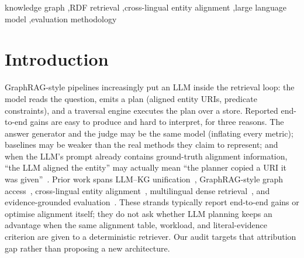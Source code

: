 \documentclass[a4paper,fleqn]{cas-dc}
\begin{document}
\begin{keywords}
knowledge graph \sep RDF retrieval \sep cross-lingual entity alignment \sep large language model \sep evaluation methodology
\end{keywords}

\maketitle

\section{Introduction}\label{sec:intro}
GraphRAG-style pipelines increasingly put an LLM inside the retrieval loop: the
model reads the question, emits a plan (aligned entity URIs, predicate
constraints), and a traversal engine executes the plan over a store. Reported
end-to-end gains are easy to produce and hard to interpret, for three reasons.
The answer generator and the judge may be the same model (inflating every
metric); baselines may be weaker than the real methods they claim to represent;
and when the LLM's prompt already contains ground-truth alignment information,
``the LLM aligned the entity'' may actually mean ``the planner copied a URI it
was given''~\cite{pan2024unifying,barnett2024seven}.
Prior work spans LLM--KG unification~\cite{pan2024unifying}, GraphRAG-style
graph access~\cite{edge2024graphrag}, cross-lingual entity
alignment~\cite{sun2018jape,yang2024segalign}, multilingual dense
retrieval~\cite{e5,zhang2023miracl}, and evidence-grounded
evaluation~\cite{thorne2018fever}. These strands typically report end-to-end
gains or optimise alignment itself; they do not ask whether LLM planning keeps
an advantage when the same alignment table, workload, and literal-evidence
criterion are given to a deterministic retriever. Our audit targets that
attribution gap rather than proposing a new architecture.
\end{document}
